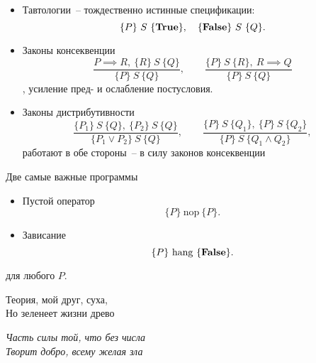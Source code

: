 \documentclass[landscape]{slides}
\begin{document}
\begin{slide}
\begin{itemize}
\item Тавтологии~-- тождественно истинные спецификации:
        \[
                \{P\}\  S \  \{\mathbf{True}\} ,
                \quad
                \{\mathbf{False}\} \ S \ \{Q\} .
        \]
\item Законы консеквенции
        \[
                \frac
                {
                        P \implies R, \  \{R\} \  S \  \{Q\}
                }
                {
                        \{P\} \  S \  \{Q\}
                } ,
                \qquad
                \frac
                {
                        \{P\} \  S \  \{R\}, \  R \implies Q
                }
                {
                        \{P\} \  S \  \{Q\}
                }
        \],
        усиление пред- и ослабление постусловия.
\item Законы дистрибутивности
        \[
                \frac
                {
                        \{P_1\} \  S \  \{Q\}, \  \{P_2\} \  S \  \{Q\}
                }
                {
                        \{P_1 \lor P_2\} \  S \  \{Q\}
                },
                \qquad
                \frac
                {
                        \{P\} \  S \  \{Q_1\}, \  \{P\} \  S \  \{Q_2\}
                }
                {
                        \{P\} \  S \  \{Q_1 \land Q_2\}
                },
        \]
        работают в обе стороны~-- в силу законов консеквенции
\end{itemize}
\end{slide}

\newcommand{\nop}{\mathrm{nop}}
\newcommand{\hang}{\mathrm{hang}}
\begin{slide}
Две самые важные программы
\begin{itemize}
\item Пустой оператор
        \[
                \{P\} \  \nop \  \{P\} .
        \]
\item Зависание
        \[
                \{P\} \  \hang \  \{\false\} .
        \]
\end{itemize}
для любого $P$.
\end{slide}

\begin{slide}
\end{slide}

\begin{slide}
\begin{center}
\begin{LARGE}
Теория, мой друг, суха,\\Но зеленеет жизни древо
\end{LARGE}
\end{center}

\begin{flushright}
\emph{Часть силы той, что без числа\\Творит добро, всему желая зла}
\end{flushright}
\end{slide}
\end{document}
